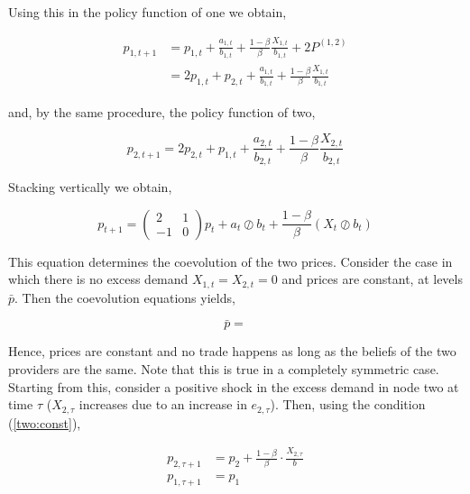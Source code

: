 Using this in the policy function of one we obtain,

\begin{equation*}
    \begin{split}
        p_{1, t+1} &= p_{1, t} + \frac{a_{1, t}}{b_{1, t}} + \frac{1 - \beta}{\beta} \frac{X_{1, t}}{b_{1, t}} + 2P^{(1, 2)} \\
        &= 2p_{1, t} + p_{2, t} + \frac{a_{1, t}}{b_{1, t}} + \frac{1 - \beta}{\beta} \frac{X_{1, t}}{b_{1, t}}
    \end{split}
\end{equation*}

and, by the same procedure, the policy function of two,

\begin{equation*}
    p_{2, t+1} = 2 p_{2, t} +  p_{1, t} + \frac{a_{2, t}}{b_{2, t}} + \frac{1 - \beta}{\beta} \frac{X_{2, t}}{b_{2, t}}
\end{equation*}

Stacking vertically we obtain,

\begin{equation}
    p_{t+1} = \begin{pmatrix}
        2  & 1 \\
        -1 & 0
    \end{pmatrix} p_t + a_t \oslash b_t + \frac{1 - \beta}{\beta} \left( X_t \oslash b_t \right)
\end{equation}

This equation determines the coevolution of the two prices. Consider the case in which there is no excess demand $X_{1, t} = X_{2, t} = 0$ and prices are constant, at levels $\bar{p}$. Then the coevolution equations yields,

\begin{equation} \label{two:const}
    \bar{p} =
\end{equation}

Hence, prices are constant and no trade happens as long as the beliefs of the two providers are the same. Note that this is true in a completely symmetric case. Starting from this, consider a positive shock in the excess demand in node two at time $\tau$ ($X_{2, \tau}$ increases due to an increase in $e_{2, \tau}$). Then, using the condition (\ref{two:const}),

\begin{equation}
    \begin{split}
        p_{2, \tau + 1} &= p_2 + \frac{1 - \beta}{\beta} \cdot \frac{X_{2, \tau}}{b} \\
        p_{1, \tau + 1} &= p_1
    \end{split}
\end{equation}


